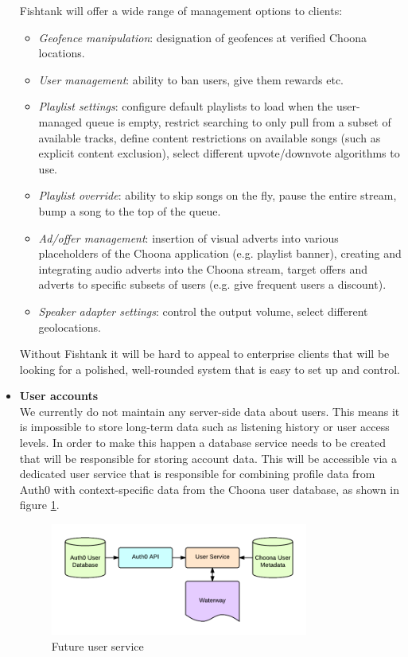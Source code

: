 \begin{itemize}
    Fishtank will offer a wide range of management options to clients:
    \begin{itemize}
      \item \textit{Geofence manipulation}: designation of geofences at verified Choona locations.
      \item \textit{User management}: ability to ban users, give them rewards etc.
      \item \textit{Playlist settings}: configure default playlists to load when the user-managed queue is empty, restrict searching to only pull from a subset of available tracks, define content restrictions on available songs (such as explicit content exclusion), select different upvote/downvote algorithms to use.
      \item \textit{Playlist override}: ability to skip songs on the fly, pause the entire stream, bump a song to the top of the queue.
      \item \textit{Ad/offer management}: insertion of visual adverts into various placeholders of the Choona application (e.g. playlist banner), creating and integrating audio adverts into the Choona stream, target offers and adverts to specific subsets of users (e.g. give frequent users a discount).
      \item \textit{Speaker adapter settings}: control the output volume, select different geolocations.
    \end{itemize}

    Without Fishtank it will be hard to appeal to enterprise clients that will be looking for a polished, well-rounded system that is easy to set up and control.

  \item \textbf{User accounts}\\
    We currently do not maintain any server-side data about users. This means it is impossible to store long-term data such as listening history or user access levels. In order to make this happen a database service needs to be created that will be responsible for storing account data. This will be accessible via a dedicated user service that is responsible for combining profile data from Auth0 with context-specific data from the Choona user database, as shown in figure \ref{fig:user-service}.

    \begin{figure}[h!]
      \centering
      \includegraphics[width=0.8\textwidth]{./img/userservice.png}
      \caption{Future user service}
      \label{fig:user-service}
    \end{figure}


\end{itemize}

